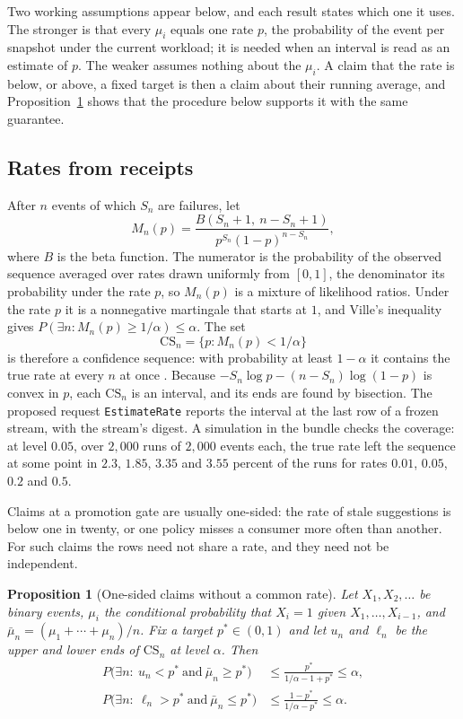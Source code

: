 \documentclass[11pt]{article}
\newcommand{\code}[1]{\texttt{#1}}
\theoremstyle{definition}
\theoremstyle{plain}
\newtheorem{proposition}[definition]{Proposition}
\begin{document}
Two working assumptions appear below, and each result states which one it uses. The stronger is
that every $\mu_i$ equals one rate $p$, the probability of the event per snapshot under the current
workload; it is needed when an interval is read as an estimate of $p$. The weaker assumes nothing
about the $\mu_i$. A claim that the rate is below, or above, a fixed target is then a claim about
their running average, and Proposition~\ref{prop:onesided-cs} shows that the procedure below
supports it with the same guarantee.

\subsection{Rates from receipts}\label{sec:cs}

After $n$ events of which $S_n$ are failures, let
\[
M_n(p)=\frac{B(S_n+1,\ n-S_n+1)}{p^{S_n}(1-p)^{n-S_n}},
\]
where $B$ is the beta function. The numerator is the probability of the observed sequence averaged
over rates drawn uniformly from $[0,1]$, the denominator its probability under the rate $p$, so
$M_n(p)$ is a mixture of likelihood ratios. Under the rate $p$ it is a nonnegative martingale that
starts at $1$, and Ville's inequality gives $P(\exists n: M_n(p)\ge 1/\alpha)\le\alpha$. The set
\[
\mathrm{CS}_n=\{p: M_n(p)<1/\alpha\}
\]
is therefore a confidence sequence: with probability at least $1-\alpha$ it contains the true rate
at every $n$ at once \cite{robbins,howard}. Because $-S_n\log p-(n-S_n)\log(1-p)$ is convex in $p$,
each $\mathrm{CS}_n$ is an interval, and its ends are found by bisection. The proposed request
\code{EstimateRate} reports the interval at the last row of a frozen stream, with the stream's
digest. A simulation in the bundle checks the coverage: at level $0.05$, over $2{,}000$ runs of
$2{,}000$ events each, the true rate left the sequence at some point in $2.3$, $1.85$, $3.35$ and
$3.55$ percent of the runs for rates $0.01$, $0.05$, $0.2$ and $0.5$.

Claims at a promotion gate are usually one-sided: the rate of stale suggestions is below one in
twenty, or one policy misses a consumer more often than another. For such claims the rows need not
share a rate, and they need not be independent.

\begin{proposition}[One-sided claims without a common rate]\label{prop:onesided-cs}
Let $X_1,X_2,\ldots$ be binary events, $\mu_i$ the conditional probability that $X_i=1$ given
$X_1,\ldots,X_{i-1}$, and $\bar\mu_n=(\mu_1+\cdots+\mu_n)/n$. Fix a target $p^*\in(0,1)$ and let
$u_n$ and $\ell_n$ be the upper and lower ends of $\mathrm{CS}_n$ at level $\alpha$. Then
\begin{align*}
P\bigl(\exists n:\ u_n<p^*\ \text{and}\ \bar\mu_n\ge p^*\bigr)&\le\frac{p^*}{1/\alpha-1+p^*}\le\alpha,\\
P\bigl(\exists n:\ \ell_n>p^*\ \text{and}\ \bar\mu_n\le p^*\bigr)&\le\frac{1-p^*}{1/\alpha-p^*}\le\alpha.
\end{align*}
\end{proposition}
\end{document}
